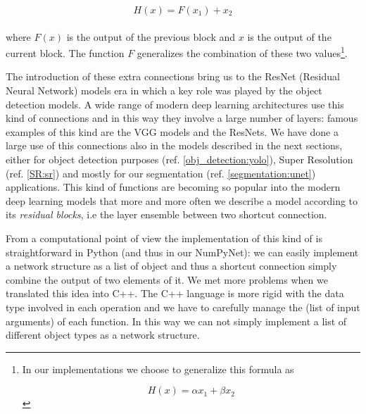 \documentclass{standalone}
\begin{document}
$$
H(x) = F(x_1) + x_2
$$
\\
where $F(x)$ is the output of the previous block and $x$ is the output of the current block.
The function $F$ generalizes the combination of these two values\footnote{
  In our implementations we choose to generalize this formula as

  $$
  H(x) = \alpha x_1 + \beta x_2
  $$
}.

The introduction of these extra connections bring us to the ResNet (Residual Neural Network) models era in which a key role was played by the object detection models.
A wide range of modern deep learning architectures use this kind of connections and in this way they involve a large number of layers: famous examples of this kind are the VGG models and the ResNets.
We have done a large use of this connections also in the models described in the next sections, either for object detection purposes (ref. \ref{obj_detection:yolo}), Super Resolution (ref. \ref{SR:sr}) and mostly for our segmentation (ref. \ref{segmentation:unet}) applications.
This kind of functions are becoming so popular into the modern deep learning models that more and more often we describe a model according to its \emph{residual blocks}, i.e the layer ensemble between two shortcut connection.

From a computational point of view the implementation of this kind of  is straightforward in Python (and thus in our NumPyNet): we can easily implement a network structure as a list of object and thus a shortcut connection simply combine the output of two elements of it.
We met more problems when we translated this idea into C++.
The C++ language is more rigid with the data type involved in each operation and we have to carefully manage the  (list of input arguments) of each function.
In this way we can not simply implement a list of different object types as a network structure.
\end{document}
